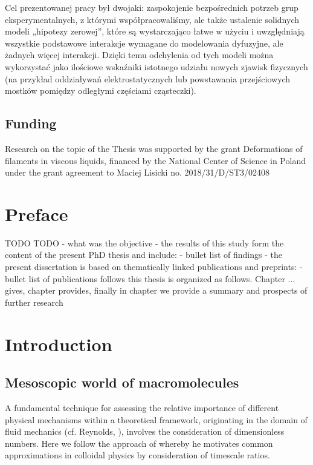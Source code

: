 \documentclass{doctoral}
\begin{document}
{Cel prezentowanej pracy był dwojaki: zaspokojenie bezpośrednich potrzeb grup eksperymentalnych, z którymi współpracowaliśmy, ale także ustalenie solidnych modeli „hipotezy zerowej”, które są wystarczająco łatwe w użyciu i uwzględniają wszystkie podstawowe interakcje wymagane do modelowania dyfuzyjne, ale żadnych więcej interakcji. Dzięki temu odchylenia od tych modeli można wykorzystać jako ilościowe wskaźniki istotnego udziału nowych zjawisk fizycznych (na przykład oddziaływań elektrostatycznych lub powstawania przejściowych mostków pomiędzy odległymi częściami cząsteczki).
}
\clearpage

\section*{Funding}
Research on the topic of the Thesis was supported by the grant 
Deformations of filaments in viscous liquids, 
financed by the National Center of Science in Poland under the grant agreement to Maciej Lisicki no. 2018/31/D/ST3/02408
\clearpage


\tableofcontents

\chapter*{Preface}

TODO TODO
- what was the objective
- the results of this study form the content of the present PhD thesis and include: - bullet list of findings
- the present dissertation is based on thematically linked publications and preprints: - bullet list of publications follows
this thesis is organized as follows. Chapter ... gives, chapter provides, finally in chapter we provide a summary and prospects of further research

\chapter{Introduction}

\section{Mesoscopic world of macromolecules}

A fundamental technique for assessing the relative importance of different physical mechanisms within a theoretical framework, originating in the domain of fluid mechanics (cf. Reynolds, \cite{Reynolds_1883}), involves the consideration of dimensionless numbers. Here we follow the approach of \cite{Nagele_2013} whereby he motivates common approximations in colloidal physics by consideration of timescale ratios.
\end{document}
